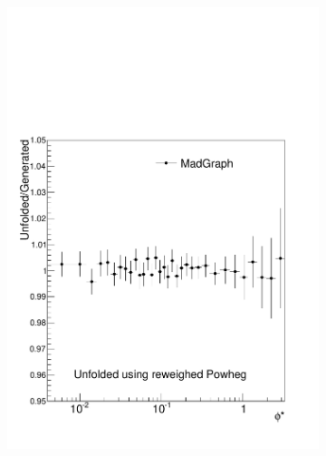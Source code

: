 \begin{figure}[!htbp]
    \centering
   \begin{subfigure}[b]{0.49\textwidth}
     \includegraphics[width=\linewidth]{figures/AnalysisSection/MadUnfolFlatPH.pdf}
     \caption{}
    \end{subfigure}
    \begin{subfigure}[b]{0.49\textwidth}

\end{subfigure}
\end{figure}

